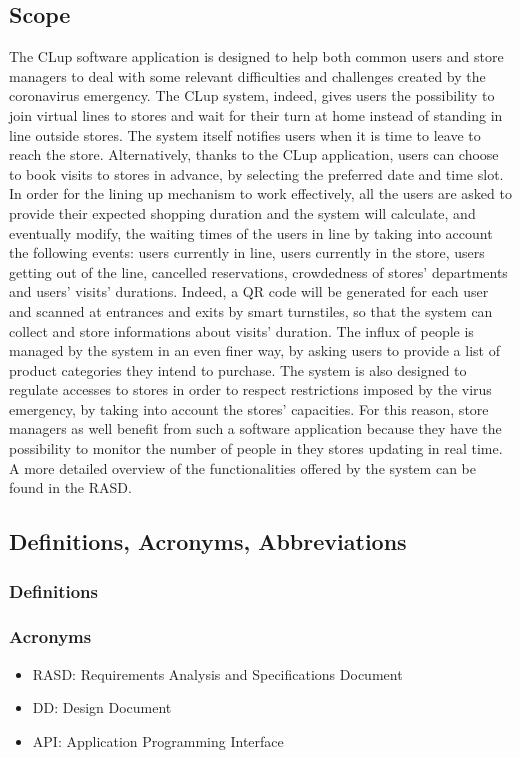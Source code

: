 \documentclass{article}
\begin{document}
\subsection{Scope}
The CLup software application is designed to help both common users and store managers to deal with some relevant difficulties and challenges created by the coronavirus emergency. The CLup system, indeed, gives users the possibility to join virtual lines to stores and wait for their turn at home instead of standing in line outside stores. The system itself notifies users when it is time to leave to reach the store. Alternatively, thanks to the CLup application, users can choose to book visits to stores in advance, by selecting the preferred date and time slot.
 In order for the lining up mechanism to work effectively, all the users are asked to provide their expected shopping duration and the system will calculate, and eventually modify, the waiting times of the users in line by taking into account the following events: users currently in line, users currently in the store, users getting out of the line, cancelled reservations, crowdedness of stores’ departments and users’ visits’ durations. Indeed, a QR code will be generated for each user and scanned at entrances and exits by smart turnstiles, so that the system can collect and store informations about visits’ duration. The influx of people is managed by the system in an even finer way, by asking users to provide a list of product categories they intend to purchase. The system is also designed to regulate accesses to stores in order to respect restrictions imposed by the virus emergency, by taking into account the stores’ capacities. For this reason, store managers as well benefit from such a software application because they have the possibility to monitor the number of people in they stores updating in real time.\\
A more detailed overview of the functionalities offered by the system can be found in the RASD.

\subsection{Definitions, Acronyms, Abbreviations}
\subsubsection{Definitions}
\subsubsection{Acronyms}
\begin{itemize}
\item RASD: Requirements Analysis and Specifications Document
\item DD: Design Document
\item API: Application Programming Interface
\end{itemize}
\end{document}
